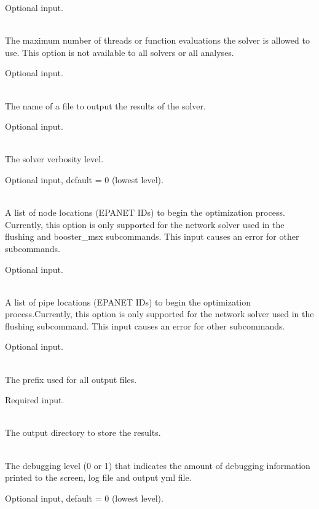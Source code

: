 \begin{description}[topsep=0pt,parsep=0.5em,itemsep=-0.4em]
\begin{description}[topsep=0pt,parsep=0.5em,itemsep=-0.4em]
            Optional input.
    \item[{threads}]\hfill
\\The maximum number of threads or function evaluations the solver is
                allowed to use.  This option is not available to all solvers or all analyses.
                
                Optional input.
    \item[{logfile}]\hfill
\\The name of a file to output the results of the solver.
                
                Optional input.
    \item[{verbose}]\hfill
\\The solver verbosity level.
                
                Optional input, default = 0 (lowest level).
    \item[{initial points}]\hfill
    \begin{description}[topsep=0pt,parsep=0.5em,itemsep=-0.4em]
      \item[{nodes}]\hfill
\\A list of node locations (EPANET IDs) to begin the optimization
        process. Currently, this option is only supported for the
        network solver used in the flushing and booster\_msx
        subcommands. This input causes an error for other subcommands.
        
        Optional input.
      \item[{pipes}]\hfill
\\A list of pipe locations (EPANET IDs) to begin the optimization
        process.Currently, this option is only supported for the
        network solver used in the flushing subcommand. This input causes an error for other subcommands.
        
        Optional input.
    \end{description}
  \end{description}
  \item[{configure}]\hfill
  \begin{description}[topsep=0pt,parsep=0.5em,itemsep=-0.4em]
    \item[{output prefix}]\hfill
\\The prefix used for all output files.
                
                Required input.
    \item[{output directory}]\hfill
      \\The output directory to store the results.
    \item[{debug}]\hfill
\\The debugging level (0 or 1) that indicates the amount of debugging 
                information printed to the screen, log file and output yml file. 
                
                Optional input, default = 0 (lowest level).
  \end{description}
\end{description}
